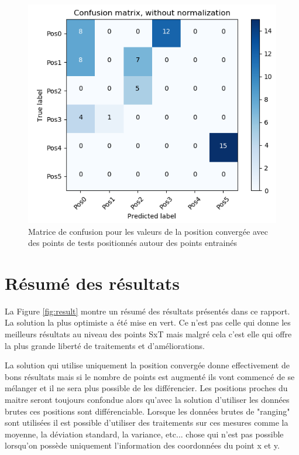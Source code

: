 \begin{figure}[htp]
	\begin{center}
		\includegraphics[scale=0.5]{figures/mat_pos_conv_Tx.png}
		\caption{Matrice de confusion pour les valeurs de la position convergée avec des points de tests positionnés autour des points entrainés}
		\label{fig:matPosConvTx} %
	\end{center}
\end{figure}

\section{Résumé des résultats}
La Figure \ref{fig:result} montre un résumé des résultats présentés dans ce rapport. La solution la plus optimiste a été mise en vert. Ce n'est pas celle qui donne les meilleurs résultats au niveau des points SxT mais malgré cela c'est elle qui offre la plus grande liberté de traitements et d'améliorations. 

La solution qui utilise uniquement la position convergée donne effectivement de bons résultats mais si le nombre de points est augmenté ils vont commencé de se mélanger et il ne sera plus possible de les différencier. Les positions proches du maitre seront toujours confondue alors qu'avec la solution d'utiliser les données brutes ces positions sont différenciable. Lorsque les données brutes de "ranging" sont utilisées il est possible d'utiliser des traitements sur ces mesures comme la moyenne, la déviation standard, la variance, etc... chose qui n'est pas possible lorsqu'on possède uniquement l'information des coordonnées du point x et y. 

